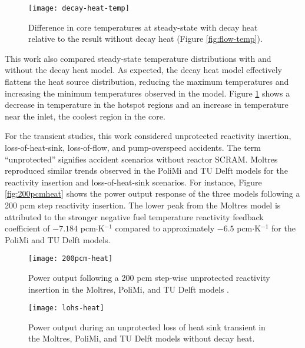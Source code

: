 \begin{figure}[htb]
    \centering
    \texttt{[image: decay-heat-temp]}
    \caption{Difference in core temperatures at steady-state with decay heat
    relative to the result without decay heat (Figure \ref{fig:flow-temp}).}
    \label{fig:decayheattemp}
\end{figure}

This work also compared steady-state temperature distributions with and without
the decay heat model. As expected, the decay heat model effectively flattens
the heat source distribution, reducing the maximum
temperatures and increasing the minimum temperatures observed in the model.
Figure \ref{fig:decayheattemp} shows a decrease in temperature in the hotspot
regions and an increase in temperature near the inlet, the coolest
region in the core.

For the transient studies, this work considered unprotected reactivity
insertion, loss-of-heat-sink, loss-of-flow, and pump-overspeed accidents. The
term ``unprotected'' signifies accident scenarios without reactor SCRAM.
Moltres reproduced similar trends observed in the PoliMi and TU Delft
models for the reactivity insertion and loss-of-heat-sink scenarios. For
instance, Figure \ref{fig:200pcmheat} shows the power output response of the
three models following a 200 pcm step reactivity insertion. The lower peak from
the Moltres model is attributed to the stronger negative fuel temperature
reactivity feedback coefficient of $-7.184$ pcm$\cdot$K$^{-1}$ compared to
approximately $-6.5$ pcm$\cdot$K$^{-1}$ for the PoliMi and TU Delft models.

\begin{figure}[htb!]
    \centering
    \begin{minipage}[b]{.49\textwidth}
      \centering
      \texttt{[image: 200pcm-heat]}
      \caption{Power output following a 200 pcm step-wise unprotected reactivity
        insertion in the Moltres, PoliMi, and
        TU Delft models \cite{fiorina_modelling_2014}.}
      \label{fig:200pcmheat}
    \end{minipage}
    \hfill
    \begin{minipage}[b]{.49\textwidth}
      \centering
      \texttt{[image: lohs-heat]}
      \caption{Power output during
        an unprotected loss of heat sink transient in the Moltres, PoliMi, and
        TU Delft models \cite{fiorina_modelling_2014} without decay heat.}
      \label{fig:lohsheat}
    \end{minipage}
\end{figure}

